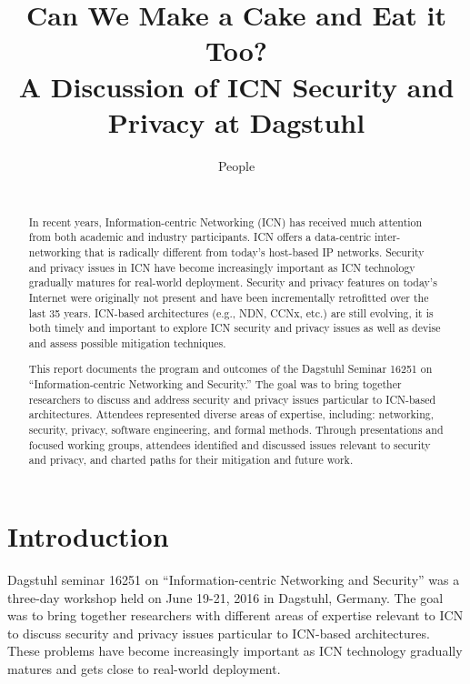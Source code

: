 \documentclass{sig-alternate-10pt}
\begin{document}
\title{Can We Make a Cake and Eat it Too? \\ A Discussion of ICN Security and Privacy at Dagstuhl}

\author{
\alignauthor
People \\
\\
}

\maketitle

\begin{abstract}
In recent years, Information-centric Networking (ICN) has received much attention from
both academic and industry participants. ICN offers a data-centric inter-networking
that is radically different from today's host-based IP networks. Security and privacy issues
in ICN have become increasingly important as ICN technology gradually matures for
real-world deployment. Security and privacy features on today's Internet
were originally not present and have been incrementally retrofitted
over the last 35 years. ICN-based architectures
(e.g., NDN, CCNx, etc.) are still evolving, it is both timely and important to explore
ICN security and privacy issues as well as devise and assess possible mitigation techniques.

This report documents the program and outcomes of the Dagstuhl Seminar 16251
on ``Information-centric Networking and Security.'' The goal was to bring together
researchers to discuss and address security and privacy issues particular to ICN-based
architectures. Attendees represented diverse areas of expertise, including: networking,
security, privacy, software engineering, and formal methods. Through presentations and
focused working groups, attendees identified and discussed issues relevant to security
and privacy, and charted paths for their mitigation and future work.
\end{abstract}

\section{Introduction}
Dagstuhl seminar 16251 on ``Information-centric Networking and Security'' was a three-day
workshop held on June 19-21, 2016 in Dagstuhl, Germany. The goal was to bring together researchers with
different areas of expertise relevant to ICN to discuss security and privacy issues
particular to ICN-based architectures. These problems have become increasingly
important as ICN technology gradually matures and gets close to real-world deployment.
\end{document}
